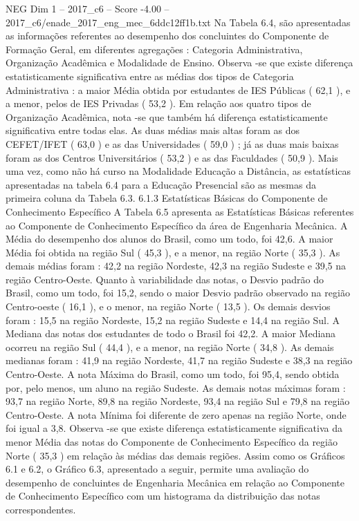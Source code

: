 \begin{textsample}{NEG Dim 1 – 2017\_c6 – Score -4.00 – 2017\_c6/enade\_2017\_eng\_mec\_6ddc12ff1b.txt}
Na Tabela 6.4, são apresentadas as informações referentes ao desempenho dos concluintes do Componente de Formação Geral, em diferentes agregações : Categoria Administrativa, Organização Acadêmica e Modalidade de Ensino.
Observa -se que existe diferença estatisticamente significativa entre as médias dos tipos de Categoria Administrativa : a maior Média obtida por estudantes de IES Públicas ( 62,1 ), e a menor, pelos de IES Privadas ( 53,2 ).
Em relação aos quatro tipos de Organização Acadêmica, nota -se que também há diferença estatisticamente significativa entre todas elas.
As duas médias mais altas foram as dos CEFET/IFET ( 63,0 ) e as das Universidades ( 59,0 ) ; já as duas mais baixas foram as dos Centros Universitários ( 53,2 ) e as das Faculdades ( 50,9 ).
Mais uma vez, como não há curso na Modalidade Educação a Distância, as estatísticas apresentadas na tabela 6.4 para a Educação Presencial são as mesmas da primeira coluna da Tabela 6.3. 6.1.3 Estatísticas Básicas do Componente de Conhecimento Específico A Tabela 6.5 apresenta as Estatísticas Básicas referentes ao Componente de Conhecimento Específico da área de Engenharia Mecânica.
A Média do desempenho dos alunos do Brasil, como um todo, foi 42,6.
A maior Média foi obtida na região Sul ( 45,3 ), e a menor, na região Norte ( 35,3 ).
As demais médias foram : 42,2 na região Nordeste, 42,3 na região Sudeste e 39,5 na região Centro-Oeste.
Quanto à variabilidade das notas, o Desvio padrão do Brasil, como um todo, foi 15,2, sendo o maior Desvio padrão observado na região Centro-oeste ( 16,1 ), e o menor, na região Norte ( 13,5 ).
Os demais desvios foram : 15,5 na região Nordeste, 15,2 na região Sudeste e 14,4 na região Sul.
A Mediana das notas dos estudantes de todo o Brasil foi 42,2.
A maior Mediana ocorreu na região Sul ( 44,4 ), e a menor, na região Norte ( 34,8 ).
As demais medianas foram : 41,9 na região Nordeste, 41,7 na região Sudeste e 38,3 na região Centro-Oeste.
A nota Máxima do Brasil, como um todo, foi 95,4, sendo obtida por, pelo menos, um aluno na região Sudeste.
As demais notas máximas foram : 93,7 na região Norte, 89,8 na região Nordeste, 93,4 na região Sul e 79,8 na região Centro-Oeste.
A nota Mínima foi diferente de zero apenas na região Norte, onde foi igual a 3,8.
Observa -se que existe diferença estatisticamente significativa da menor Média das notas do Componente de Conhecimento Específico da região Norte ( 35,3 ) em relação às médias das demais regiões.
Assim como os Gráficos 6.1 e 6.2, o Gráfico 6.3, apresentado a seguir, permite uma avaliação do desempenho de concluintes de Engenharia Mecânica em relação ao Componente de Conhecimento Específico com um histograma da distribuição das notas correspondentes.

\end{textsample}
